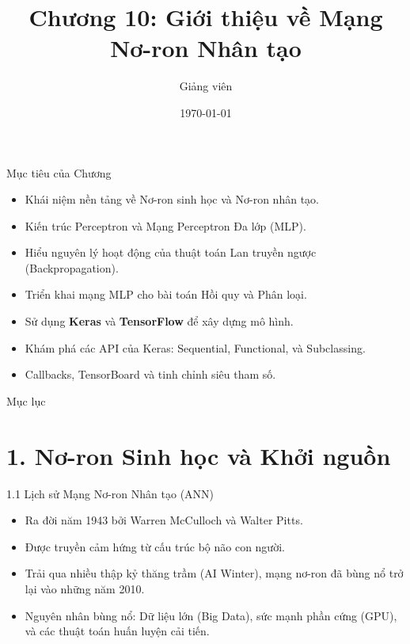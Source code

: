 \documentclass[aspectratio=169, 12pt]{beamer}
\title[ML - Chap 10]{Chương 10: Giới thiệu về Mạng Nơ-ron Nhân tạo}
\author[Giảng viên]{Giảng viên}
\institute[Đại học Đông Á]{Đại học Đông Á}
\date{\today}
\begin{document}
\begin{frame}
    \titlepage
\end{frame}

\begin{frame}{Mục tiêu của Chương}
    \begin{itemize}
        \item Khái niệm nền tảng về Nơ-ron sinh học và Nơ-ron nhân tạo.
        \item Kiến trúc Perceptron và Mạng Perceptron Đa lớp (MLP).
        \item Hiểu nguyên lý hoạt động của thuật toán Lan truyền ngược (Backpropagation).
        \item Triển khai mạng MLP cho bài toán Hồi quy và Phân loại.
        \item Sử dụng \textbf{Keras} và \textbf{TensorFlow} để xây dựng mô hình.
        \item Khám phá các API của Keras: Sequential, Functional, và Subclassing.
        \item Callbacks, TensorBoard và tinh chỉnh siêu tham số.
    \end{itemize}
\end{frame}

\begin{frame}{Mục lục}
    \tableofcontents
\end{frame}

\section{1. Nơ-ron Sinh học và Khởi nguồn}

\begin{frame}{1.1 Lịch sử Mạng Nơ-ron Nhân tạo (ANN)}
    \begin{itemize}
        \item Ra đời năm 1943 bởi Warren McCulloch và Walter Pitts.
        \item Được truyền cảm hứng từ cấu trúc bộ não con người.
        \item Trải qua nhiều thập kỷ thăng trầm (AI Winter), mạng nơ-ron đã bùng nổ trở lại vào những năm 2010.
        \item Nguyên nhân bùng nổ: Dữ liệu lớn (Big Data), sức mạnh phần cứng (GPU), và các thuật toán huấn luyện cải tiến.
    \end{itemize}
\end{frame}
\end{document}

